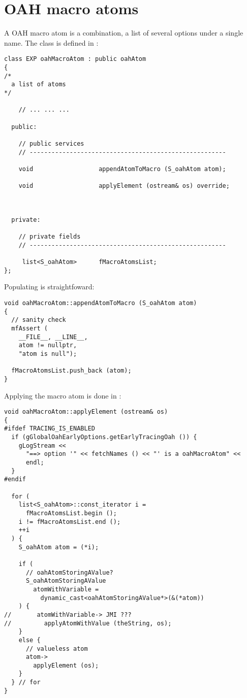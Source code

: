 \section{OAH macro atoms}

A OAH macro atom is a combination, a list of several options under a single name. The  class is defined in :
\begin{lstlisting}[language=CPlusPlus]
class EXP oahMacroAtom : public oahAtom
{
/*
  a list of atoms
*/

	// ... ... ...

  public:

    // public services
    // ------------------------------------------------------

    void                  appendAtomToMacro (S_oahAtom atom);

    void                  applyElement (ostream& os) override;



  private:

    // private fields
    // ------------------------------------------------------

     list<S_oahAtom>      fMacroAtomsList;
};
\end{lstlisting}

Populating  is straightfoward:
\begin{lstlisting}[language=CPlusPlus]
void oahMacroAtom::appendAtomToMacro (S_oahAtom atom)
{
  // sanity check
  mfAssert (
    __FILE__, __LINE__,
    atom != nullptr,
    "atom is null");

  fMacroAtomsList.push_back (atom);
}
\end{lstlisting}

Applying the macro atom is done in :
\begin{lstlisting}[language=CPlusPlus]
void oahMacroAtom::applyElement (ostream& os)
{
#ifdef TRACING_IS_ENABLED
  if (gGlobalOahEarlyOptions.getEarlyTracingOah ()) {
    gLogStream <<
      "==> option '" << fetchNames () << "' is a oahMacroAtom" <<
      endl;
  }
#endif

  for (
    list<S_oahAtom>::const_iterator i =
      fMacroAtomsList.begin ();
    i != fMacroAtomsList.end ();
    ++i
  ) {
    S_oahAtom atom = (*i);

    if (
      // oahAtomStoringAValue?
      S_oahAtomStoringAValue
        atomWithVariable =
          dynamic_cast<oahAtomStoringAValue*>(&(*atom))
    ) {
//       atomWithVariable-> JMI ???
//         applyAtomWithValue (theString, os);
    }
    else {
      // valueless atom
      atom->
        applyElement (os);
    }
  } // for
}
\end{lstlisting}


